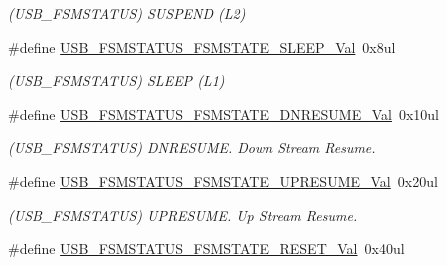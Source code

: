 \begin{DoxyCompactItemize}
\begin{DoxyCompactList}\small\item\em (U\+S\+B\+\_\+\+F\+S\+M\+S\+T\+A\+T\+U\+S) S\+U\+S\+P\+E\+N\+D (L2) \end{DoxyCompactList}\item 
\hypertarget{group___s_a_m_l21___u_s_b_gad784f6462df68811e79b524c1e026e1e}{}\#define \hyperlink{group___s_a_m_l21___u_s_b_gad784f6462df68811e79b524c1e026e1e}{U\+S\+B\+\_\+\+F\+S\+M\+S\+T\+A\+T\+U\+S\+\_\+\+F\+S\+M\+S\+T\+A\+T\+E\+\_\+\+S\+L\+E\+E\+P\+\_\+\+Val}~0x8ul\label{group___s_a_m_l21___u_s_b_gad784f6462df68811e79b524c1e026e1e}

\begin{DoxyCompactList}\small\item\em (U\+S\+B\+\_\+\+F\+S\+M\+S\+T\+A\+T\+U\+S) S\+L\+E\+E\+P (L1) \end{DoxyCompactList}\item 
\hypertarget{group___s_a_m_l21___u_s_b_ga59b7422057d8f9794ebb827253bdd939}{}\#define \hyperlink{group___s_a_m_l21___u_s_b_ga59b7422057d8f9794ebb827253bdd939}{U\+S\+B\+\_\+\+F\+S\+M\+S\+T\+A\+T\+U\+S\+\_\+\+F\+S\+M\+S\+T\+A\+T\+E\+\_\+\+D\+N\+R\+E\+S\+U\+M\+E\+\_\+\+Val}~0x10ul\label{group___s_a_m_l21___u_s_b_ga59b7422057d8f9794ebb827253bdd939}

\begin{DoxyCompactList}\small\item\em (U\+S\+B\+\_\+\+F\+S\+M\+S\+T\+A\+T\+U\+S) D\+N\+R\+E\+S\+U\+M\+E. Down Stream Resume. \end{DoxyCompactList}\item 
\hypertarget{group___s_a_m_l21___u_s_b_ga6c9420acb01f1143c26eb341646bdfd4}{}\#define \hyperlink{group___s_a_m_l21___u_s_b_ga6c9420acb01f1143c26eb341646bdfd4}{U\+S\+B\+\_\+\+F\+S\+M\+S\+T\+A\+T\+U\+S\+\_\+\+F\+S\+M\+S\+T\+A\+T\+E\+\_\+\+U\+P\+R\+E\+S\+U\+M\+E\+\_\+\+Val}~0x20ul\label{group___s_a_m_l21___u_s_b_ga6c9420acb01f1143c26eb341646bdfd4}

\begin{DoxyCompactList}\small\item\em (U\+S\+B\+\_\+\+F\+S\+M\+S\+T\+A\+T\+U\+S) U\+P\+R\+E\+S\+U\+M\+E. Up Stream Resume. \end{DoxyCompactList}\item 
\hypertarget{group___s_a_m_l21___u_s_b_ga2b6360b48e2e09457988f60d8152f203}{}\#define \hyperlink{group___s_a_m_l21___u_s_b_ga2b6360b48e2e09457988f60d8152f203}{U\+S\+B\+\_\+\+F\+S\+M\+S\+T\+A\+T\+U\+S\+\_\+\+F\+S\+M\+S\+T\+A\+T\+E\+\_\+\+R\+E\+S\+E\+T\+\_\+\+Val}~0x40ul\label{group___s_a_m_l21___u_s_b_ga2b6360b48e2e09457988f60d8152f203}


\end{DoxyCompactItemize}
